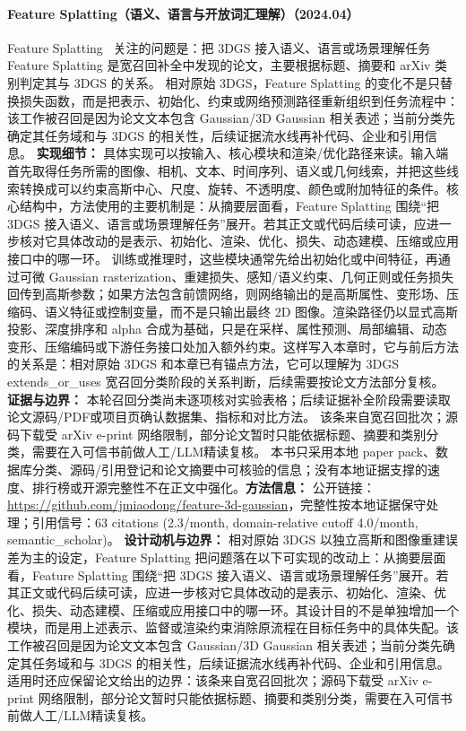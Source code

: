 \paragraph{Feature Splatting（语义、语言与开放词汇理解）（2024.04）}
Feature Splatting~\cite{2404_01223} 关注的问题是：把 3DGS 接入语义、语言或场景理解任务 Feature Splatting 是宽召回补全中发现的论文，主要根据标题、摘要和 arXiv 类别判定其与 3DGS 的关系。
相对原始 3DGS，Feature Splatting 的变化不是只替换损失函数，而是把表示、初始化、约束或网络预测路径重新组织到任务流程中：该工作被召回是因为论文文本包含 Gaussian/3D Gaussian 相关表述；当前分类先确定其任务域和与 3DGS 的相关性，后续证据流水线再补代码、企业和引用信息。
\textbf{实现细节：} 具体实现可以按输入、核心模块和渲染/优化路径来读。输入端首先取得任务所需的图像、相机、文本、时间序列、语义或几何线索，并把这些线索转换成可以约束高斯中心、尺度、旋转、不透明度、颜色或附加特征的条件。核心结构中，方法使用的主要机制是：从摘要层面看，Feature Splatting 围绕“把 3DGS 接入语义、语言或场景理解任务”展开。若其正文或代码后续可读，应进一步核对它具体改动的是表示、初始化、渲染、优化、损失、动态建模、压缩或应用接口中的哪一环。 训练或推理时，这些模块通常先给出初始化或中间特征，再通过可微 Gaussian rasterization、重建损失、感知/语义约束、几何正则或任务损失回传到高斯参数；如果方法包含前馈网络，则网络输出的是高斯属性、变形场、压缩码、语义特征或控制变量，而不是只输出最终 2D 图像。渲染路径仍以显式高斯投影、深度排序和 alpha 合成为基础，只是在采样、属性预测、局部编辑、动态变形、压缩编码或下游任务接口处加入额外约束。这样写入本章时，它与前后方法的关系是：相对原始 3DGS 和本章已有锚点方法，它可以理解为 3DGS extends\_or\_uses 宽召回分类阶段的关系判断，后续需要按论文方法部分复核。
\textbf{证据与边界：} 本轮召回分类尚未逐项核对实验表格；后续证据补全阶段需要读取论文源码/PDF或项目页确认数据集、指标和对比方法。 该条来自宽召回批次；源码下载受 arXiv e-print 网络限制，部分论文暂时只能依据标题、摘要和类别分类，需要在入可信书前做人工/LLM精读复核。 本书只采用本地 paper pack、数据库分类、源码/引用登记和论文摘要中可核验的信息；没有本地证据支撑的速度、排行榜或开源完整性不在正文中强化。\textbf{方法信息：} 公开链接：\url{https://github.com/jmiaodong/feature-3d-gaussian}，完整性按本地证据保守处理；引用信号：63 citations (2.3/month, domain-relative cutoff 4.0/month, semantic\_scholar)。
\textbf{设计动机与边界：} 相对原始 3DGS 以独立高斯和图像重建误差为主的设定，Feature Splatting 把问题落在以下可实现的改动上：从摘要层面看，Feature Splatting 围绕“把 3DGS 接入语义、语言或场景理解任务”展开。若其正文或代码后续可读，应进一步核对它具体改动的是表示、初始化、渲染、优化、损失、动态建模、压缩或应用接口中的哪一环。其设计目的不是单独增加一个模块，而是用上述表示、监督或渲染约束消除原流程在目标任务中的具体失配。该工作被召回是因为论文文本包含 Gaussian/3D Gaussian 相关表述；当前分类先确定其任务域和与 3DGS 的相关性，后续证据流水线再补代码、企业和引用信息。适用时还应保留论文给出的边界：该条来自宽召回批次；源码下载受 arXiv e-print 网络限制，部分论文暂时只能依据标题、摘要和类别分类，需要在入可信书前做人工/LLM精读复核。
